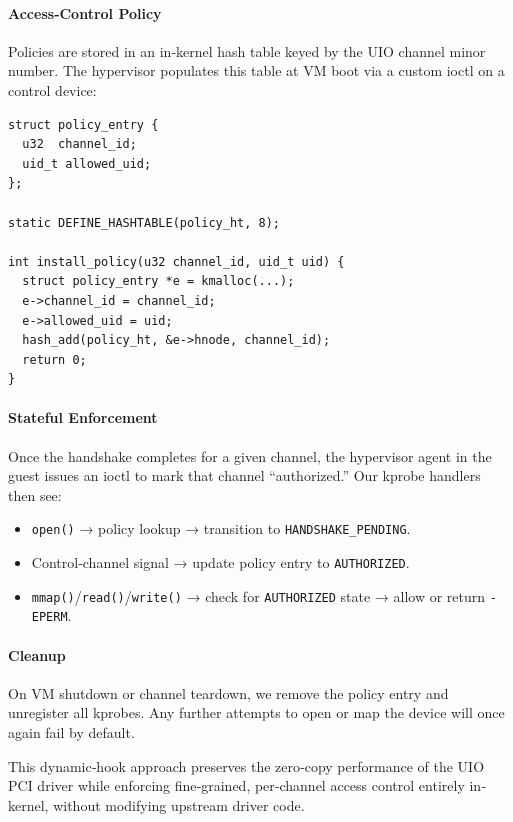\documentclass[conference]{IEEEtran}
\begin{document}
\paragraph{Access‐Control Policy}
Policies are stored in an in‐kernel hash table keyed by the UIO channel minor
number. The hypervisor populates this table at VM boot via a custom ioctl on a
control device:

\begin{verbatim}
struct policy_entry {
  u32  channel_id;
  uid_t allowed_uid;
};

static DEFINE_HASHTABLE(policy_ht, 8);

int install_policy(u32 channel_id, uid_t uid) {
  struct policy_entry *e = kmalloc(...);
  e->channel_id = channel_id;
  e->allowed_uid = uid;
  hash_add(policy_ht, &e->hnode, channel_id);
  return 0;
}
\end{verbatim}

\paragraph{Stateful Enforcement}
Once the handshake completes for a given channel, the hypervisor agent in the
guest issues an ioctl to mark that channel “authorized.” Our kprobe handlers
then see:

\begin{itemize}
  \item \texttt{open()} → policy lookup → transition to \texttt{HANDSHAKE\_PENDING}.
  \item Control‐channel signal → update policy entry to \texttt{AUTHORIZED}.
  \item \texttt{mmap()}/\texttt{read()}/\texttt{write()} → check for \texttt{AUTHORIZED} state → allow or return \texttt{-EPERM}.
\end{itemize}

\paragraph{Cleanup}
On VM shutdown or channel teardown, we remove the policy entry and unregister
all kprobes. Any further attempts to open or map the device will once again
fail by default.

This dynamic‐hook approach preserves the zero‐copy performance of the UIO PCI
driver while enforcing fine‐grained, per‐channel access control entirely
in‐kernel, without modifying upstream driver code.

\end{document}
